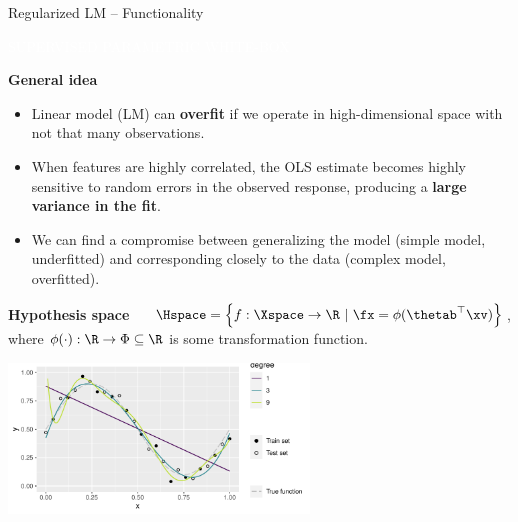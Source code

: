 \documentclass[11pt,compress,t,notes=noshow, xcolor=table]{beamer}
\newcommand{\maketag}[1]{\colorbox{highlightcol}{\textcolor{white}
{\MakeUppercase{#1}}}}
\newcommand{\highlight}[1]{\textcolor{highlightcol}{\textbf{#1}}}
\begin{document}
\begin{frame}{Regularized LM -- Functionality}

\footnotesize

\maketag{SUPERVISED}
\maketag{PARAMETRIC}
\maketag{WHITE-BOX}

\medskip

\highlight{General idea} ~~
\begin{itemize}

\item Linear model (LM) can \textbf{overfit} if we operate in high-dimensional space with not that many observations.

\item When features are highly correlated, the OLS estimate becomes highly sensitive to random errors in the observed response, producing a \textbf{large variance in the fit}.

\item We can find a compromise between generalizing the model (simple model, underfitted) and corresponding closely to the data (complex model, overfitted).

\end{itemize}

\medskip

\highlight{Hypothesis space} ~~
$\Hspace = \left\{f: \Xspace \to \R ~|~\fx = \phi(\thetab^\top \xv)\right\}$, 
where $\phi(\cdot): \R \to \Phi \subseteq \R$ is some transformation function.



\medskip
\centering
  \includegraphics[width=0.6\textwidth]{figure/reg_lm_overfitting.pdf}

\end{frame}
\end{document}

